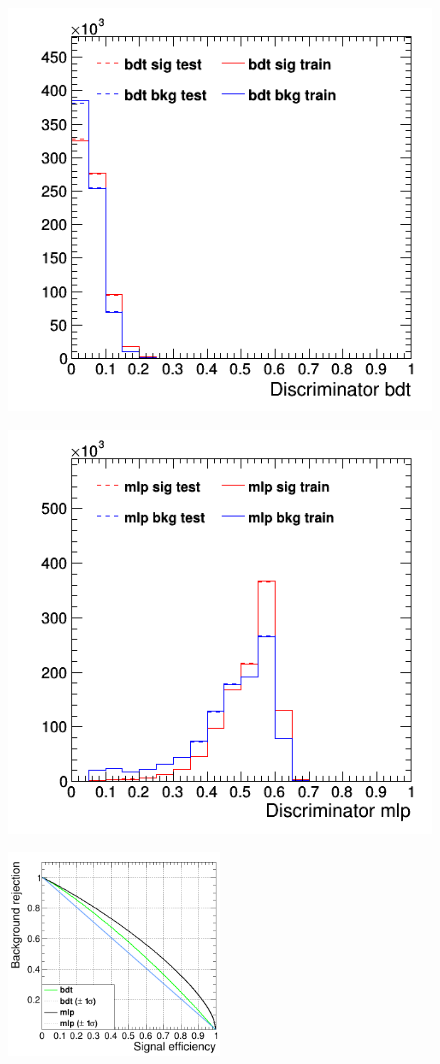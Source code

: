 \documentclass[11pt]{scrartcl}
\begin{document}
	\begin{figure}[H]
	\centering
	\begin{minipage}{.5\textwidth}
	  \centering
	  \includegraphics[width=0.75\linewidth]{figures/MVA/select2/config2/discriminator_bdt.png}
	  \label{fig:distr_s2_config2_bdt}
	\end{minipage}%
	\begin{minipage}{.5\textwidth}
	  \centering
	  \includegraphics[width=0.75\linewidth]{figures/MVA/select2/config2/discriminator_mlp.png}
	  \label{fig:distr_s2_config2_mlp}
	\end{minipage}
	\centering
	\includegraphics[width=0.5\textwidth]{figures/MVA/select2/config2/FOM_selection2_nL7_nT800_mD3_nC20.png}

\end{figure}
\end{document}
